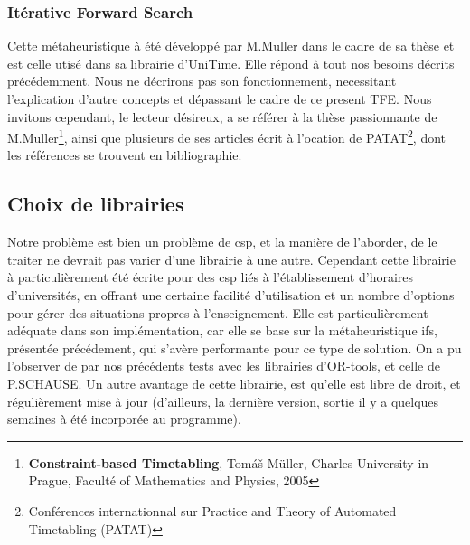 \subsubsection{Itérative Forward Search}
Cette métaheuristique à été développé par M.Muller dans le cadre de sa thèse et est celle utisé dans sa librairie d'UniTime. 
Elle répond à tout nos besoins décrits précédemment. Nous ne décrirons pas son fonctionnement, 
necessitant l'explication d'autre concepts et dépassant le cadre de ce present TFE. Nous invitons cependant, le lecteur désireux, a se référer à la thèse passionnante de M.Muller\footnote{\textbf{Constraint-based Timetabling}, Tomáš Müller, Charles University in Prague, Faculté of Mathematics and Physics, 2005}, ainsi que plusieurs de ses articles écrit à l'ocation de PATAT\footnote{Conférences internationnal sur Practice and Theory of Automated Timetabling (PATAT)}, dont les références se trouvent en bibliographie.


\subsection{Choix de librairies}
Notre problème est bien un problème de csp, et la manière de l'aborder, de le traiter ne devrait pas varier d'une librairie à une autre.  Cependant cette librairie à particulièrement été écrite pour des csp liés à l'établissement d'horaires d'universités, en offrant une certaine facilité d'utilisation et un nombre d'options pour gérer des situations propres à l'enseignement.
Elle est particulièrement adéquate dans son implémentation, car elle se base sur la métaheuristique ifs, présentée précédement, qui s'avère performante pour ce type de solution.  On a pu l'observer de par nos précédents tests avec les librairies d'OR-tools, et celle de P.SCHAUSE.
\newline
\indent
Un autre avantage de cette librairie, est qu'elle est libre de droit, et régulièrement mise à jour (d'ailleurs, la dernière version, sortie il y a quelques semaines à été incorporée au programme).


